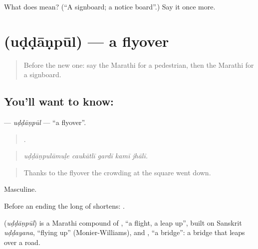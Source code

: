 \begin{tcolorbox}[breakable,colback=teal!4,colframe=teal!35!black,title={Before you move on}]
What does  mean? (\textquotedblleft{}A signboard; a notice board\textquotedblright{}.) Say it once more.
\end{tcolorbox}
\section[\texorpdfstring{\mr{उड्डाणपूल} (uḍḍāṇpūl)}{उड्डाणपूल (uḍḍāṇpūl)}]{ (uḍḍāṇpūl) — a flyover}

\label{lesson:MR-C406-uddanpul}



\begin{quote}
Before the new one: say the Marathi for a pedestrian, then the Marathi for a signboard.
\end{quote}

\subsection*{You'll want to know: }
\textbf{} — \emph{uḍḍāṇpūl} — \textquotedblleft{}a flyover\textquotedblright{}.

\begin{quote}
    .
\end{quote}

\begin{quote}
\emph{uḍḍāṇpulāmuḷe caukātlī gardī kamī jhālī.}
\end{quote}

\begin{quote}
Thanks to the flyover the crowding at the square went down.
\end{quote}

Masculine.

Before an ending the long  of  shortens: .

\begin{cousinweb}
\textbf{} (\emph{uḍḍāṇpūl}) is a Marathi compound of \textbf{}, \textquotedblleft{}a flight, a leap up\textquotedblright{}, built on Sanskrit \emph{uḍḍayana}, \textquotedblleft{}flying up\textquotedblright{} (Monier-Williams), and \textbf{}, \textquotedblleft{}a bridge\textquotedblright{}: a bridge that leaps over a road.
\end{cousinweb}

